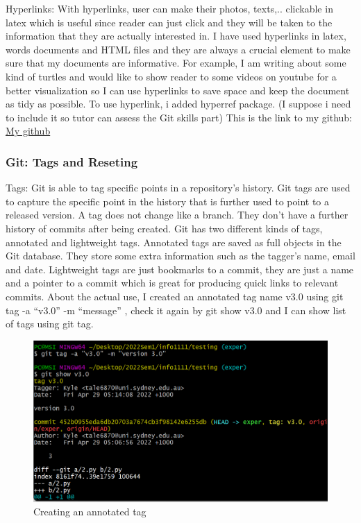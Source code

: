 \documentclass[a4paper, 11pt]{report}
\begin{document}
Hyperlinks: With hyperlinks, user can make their photos, texts,.. clickable in latex which is useful since reader can just click and they will be taken to the information that they are actually interested in. I have used hyperlinks in latex, words documents and HTML files and they are always a crucial element to make sure that my documents are informative. For example, I am writing about some kind of turtles and would like to show reader to some videos on youtube for a better visualization so I can use hyperlinks to save space and keep the document as tidy as possible. To use hyperlink, i added hyperref package.
(I suppose i need to include it so tutor can assess the Git skills part) This is the link to my github: \href{https://github.com/Kyle240/testing.git}{My github}

\subsubsection{ Git: Tags and Reseting}

Tags: Git is able to tag specific points in a repository’s history. Git tags are used to capture the specific point in the history that is further used to point to a released version. A tag does not change like a branch. They don’t have a further history of commits after being created. Git has two different kinds of tags, annotated and lightweight tags. Annotated tags are saved as full objects in the Git database. They store some extra information such as the tagger’s name, email and date. Lightweight tags are just bookmarks to a commit, they are just a name and a pointer to a commit which is great for producing quick links to relevant commits. About the actual use, I created an annotated tag name v3.0 using git tag -a “v3.0” -m “message” , check it again by git show v3.0  and I can show list of tags using git tag. 

\begin{figure}[!h]
\centering
\includegraphics[width=0.45\columnwidth]{Picture1.png}
\caption{Creating an annotated tag}
\label{fig}
\end{figure}
\end{document}
